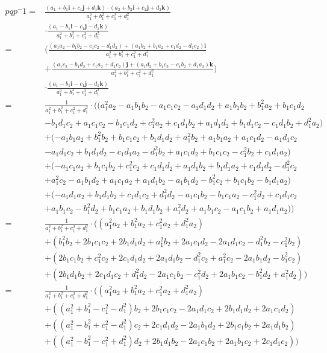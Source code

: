 \documentclass[a4paper, 12pt]{article}
\newcommand{\ui}{\mathbf{i}}
\newcommand{\uj}{\mathbf{j}}
\newcommand{\uk}{\mathbf{k}}
\newcommand{\quat}[4]{#1#2\ui#3\uj#4\uk}
\newcommand{\quats}[4]{#1+#2\ui+#3\uj+#4\uk}
\begin{document}
\begin{align*}
  pqp^-1
  = & \frac{(\quats{a_1}{b_1}{c_1}{d_1}) \cdot (\quats{a_2}{b_2}{c_2}{d_2})}{a_1^2+b_1^2+c_1^2+d_1^2} \\
  & \cdot \frac{(\quat{a_1}{-b_1}{-c_1}{-d_1})}{a_1^2+b_1^2+c_1^2+d_1^2} \\
  = & (\frac{(a_1a_2 - b_1b_2 - c_1c_2 - d_1d_2)+(a_1b_2 + b_1a_2 + c_1d_2 - d_1c_2)\ui}{a_1^2+b_1^2+c_1^2+d_1^2} \\
  & + \frac{(a_1c_2 - b_1d_2 + c_1a_2 + d_1c_2)\uj+(a_1d_2 + b_1c_2 - c_1b_2 + d_1a_2)\uk}{a_1^2+b_1^2+c_1^2+d_1^2}) \\
  & \cdot \frac{(\quat{a_1}{-b_1}{-c_1}{-d_1})}{a_1^2+b_1^2+c_1^2+d_1^2} \\
  = & \frac{1}{a_1^2+b_1^2+c_1^2+d_1^2}\cdot ((a_1^2a_2 - a_1b_1b_2 - a_1c_1c_2 - a_1d_1d_2 + a_1b_1b_2 + b_1^2a_2 + b_1c_1d_2 \\
  & - b_1d_1c_2 + a_1c_1c_2 - b_1c_1d_2 + c_1^2a_2 + c_1d_1b_2 + a_1d_1d_2 + b_1d_1c_2 - c_1d_1b_2 + d_1^2a_2) \\
  & + ( - a_1b_1a_2 + b_1^2b_2 + b_1c_1c_2 + b_1d_1d_2 + a_1^2b_2 + a_1b_1a_2 + a_1c_1d_2 - a_1d_1c_2 \\
  & - a_1d_1c_2 + b_1d_1d_2 - c_1d_1a_2 - d_1^2b_2 + a_1c_1d_2 + b_1c_1c_2 - c_1^2b_2 + c_1d_1a_2) \\
  & + ( - a_1c_1a_2 + b_1c_1b_2 + c_1^2c_2 + c_1d_1d_2 + a_1d_1b_2 + b_1d_1a_2 + c_1d_1d_2 - d_1^2c_2 \\
  & + a_1^2c_2 - a_1b_1d_2 + a_1c_1a_2 + a_1d_1b_2 - a_1b_1d_2 - b_1^2c_2 + b_1c_1b_2 - b_1d_1a_2) \\
  & + (- a_1d_1a_2 + b_1d_1b_2 + c_1d_1c_2 + d_1^2d_2 - a_1c_1b_2 - b_1c_1a_2 - c_1^2d_2 + c_1d_1c_2 \\
  & + a_1b_1c_2 - b_1^2d_2 + b_1c_1a_2 + b_1d_1b_2 + a_1^2d_2 + a_1b_1c_2 - a_1c_1b_2 + a_1d_1a_2))\\
  = & \frac{1}{a_1^2+b_1^2+c_1^2+d_1^2}\cdot ((a_1^2a_2 + b_1^2a_2 + c_1^2a_2 + d_1^2a_2) \\
  & + (b_1^2b_2 + 2b_1c_1c_2 + 2b_1d_1d_2 + a_1^2b_2 + 2a_1c_1d_2 - 2a_1d_1c_2 - d_1^2b_2 - c_1^2b_2) \\
  & + (2b_1c_1b_2 + c_1^2c_2 + 2c_1d_1d_2 + 2a_1d_1b_2 - d_1^2c_2 + a_1^2c_2 - 2a_1b_1d_2 - b_1^2c_2) \\
  & + (2b_1d_1b_2 + 2c_1d_1c_2 + d_1^2d_2 - 2a_1c_1b_2 - c_1^2d_2 + 2a_1b_1c_2 - b_1^2d_2 + a_1^2d_2))\\
  = & \frac{1}{a_1^2+b_1^2+c_1^2+d_1^2}\cdot ((a_1^2a_2 + b_1^2a_2 + c_1^2a_2 + d_1^2a_2) \\
  & + ((a_1^2 + b_1^2 - c_1^2 - d_1^2)b_2 + 2b_1c_1c_2 - 2a_1d_1c_2 + 2b_1d_1d_2 + 2a_1c_1d_2) \\
  & + ((a_1^2 - b_1^2 + c_1^2 - d_1^2)c_2 + 2c_1d_1d_2 - 2a_1b_1d_2 + 2b_1c_1b_2 + 2a_1d_1b_2) \\
  & + ((a_1^2 - b_1^2 - c_1^2 + d_1^2)d_2 + 2b_1d_1b_2 - 2a_1c_1b_2 + 2a_1b_1c_2 + 2c_1d_1c_2))\\
\end{align*}
\end{document}
